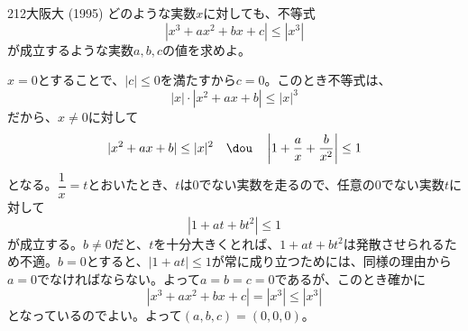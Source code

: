 \begin{prob}{212}{}{大阪大 (1995)}
 どのような実数$x$に対しても、不等式
 \[ |x^3+ax^2+bx+c| \le |x^3| \]
 が成立するような実数$a, b, c$の値を求めよ。
\end{prob}

$x=0$とすることで、$|c|\le 0$を満たすから$c=0$。このとき不等式は、
\[ |x|\cdot|x^2+ax+b| \le |x|^3 \]
だから、$x\neq 0$に対して
\[ |x^2+ax+b|\le |x|^2 \quad\dou\quad \left|1+\frac{a}{x}+\frac{b}{x^2}\right| \le 1 \]
となる。$\dfrac{1}{x}=t$とおいたとき、$t$は0でない実数を走るので、任意の0でない実数$t$に対して
\[ |1+at+bt^2| \le 1 \]
が成立する。$b\neq 0$だと、$t$を十分大きくとれば、$1+at+bt^2$は発散させられるため不適。$b=0$とすると、$|1+at|\le 1$が常に成り立つためには、同様の理由から$a=0$でなければならない。よって$a=b=c=0$であるが、このとき確かに
\[ |x^3+ax^2+bx+c|=|x^3|\le |x^3| \]
となっているのでよい。よって$(a, b, c)=(0, 0, 0)$。